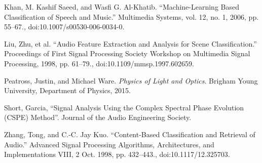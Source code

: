 \documentclass[12pt,letterpaper]{article}
\begin{document}
\begin{thebibliography}{9}


Khan, M. Kashif Saeed, and Wasfi G. Al-Khatib. “Machine-Learning Based Classification of Speech and Music.” Multimedia Systems, vol. 12, no. 1, 2006, pp. 55–67., doi:10.1007/s00530-006-0034-0.

Liu, Zhu, et al. “Audio Feature Extraction and Analysis for Scene Classification.” Proceedings of First Signal Processing Society Workshop on Multimedia Signal Processing, 1998, pp. 61–79., doi:10.1109/mmsp.1997.602659.

Peatross, Justin, and Michael Ware. \textit{Physics of Light and Optics}. Brigham Young University, Department of Physics, 2015.

Short, Garcia, “Signal Analysis Using the Complex Spectral Phase Evolution (CSPE) Method”. Journal of the Audio Engineering Society.

Zhang, Tong, and C.-C. Jay Kuo. “Content-Based Classification and Retrieval of Audio.” Advanced Signal Processing Algorithms, Architectures, and Implementations VIII, 2 Oct. 1998, pp. 432–443., doi:10.1117/12.325703.


\end{thebibliography}

\end{document}
